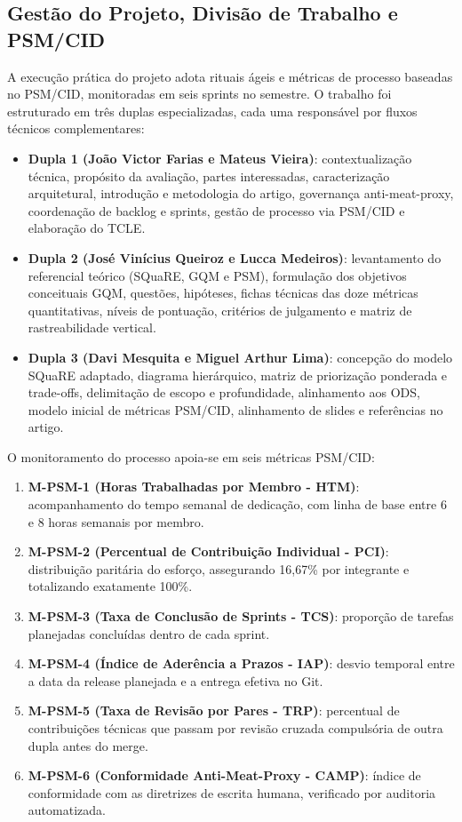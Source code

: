 \documentclass[journal]{IEEEtran}
\begin{document}
\subsection{Gestão do Projeto, Divisão de Trabalho e PSM/CID}
\label{sec:gestao_psm}

A execução prática do projeto adota rituais ágeis e métricas de processo baseadas no PSM/CID, monitoradas em seis sprints no semestre. O trabalho foi estruturado em três duplas especializadas, cada uma responsável por fluxos técnicos complementares:

\begin{itemize}
    \item \textbf{Dupla 1 (João Victor Farias e Mateus Vieira)}: contextualização técnica, propósito da avaliação, partes interessadas, caracterização arquitetural, introdução e metodologia do artigo, governança anti-meat-proxy, coordenação de backlog e sprints, gestão de processo via PSM/CID e elaboração do TCLE.
    \item \textbf{Dupla 2 (José Vinícius Queiroz e Lucca Medeiros)}: levantamento do referencial teórico (SQuaRE, GQM e PSM), formulação dos objetivos conceituais GQM, questões, hipóteses, fichas técnicas das doze métricas quantitativas, níveis de pontuação, critérios de julgamento e matriz de rastreabilidade vertical.
    \item \textbf{Dupla 3 (Davi Mesquita e Miguel Arthur Lima)}: concepção do modelo SQuaRE adaptado, diagrama hierárquico, matriz de priorização ponderada e trade-offs, delimitação de escopo e profundidade, alinhamento aos ODS, modelo inicial de métricas PSM/CID, alinhamento de slides e referências no artigo.
\end{itemize}

O monitoramento do processo apoia-se em seis métricas PSM/CID:
\begin{enumerate}
    \item \textbf{M-PSM-1 (Horas Trabalhadas por Membro - HTM)}: acompanhamento do tempo semanal de dedicação, com linha de base entre 6 e 8 horas semanais por membro.
    \item \textbf{M-PSM-2 (Percentual de Contribuição Individual - PCI)}: distribuição paritária do esforço, assegurando 16,67\% por integrante e totalizando exatamente 100\%.
    \item \textbf{M-PSM-3 (Taxa de Conclusão de Sprints - TCS)}: proporção de tarefas planejadas concluídas dentro de cada sprint.
    \item \textbf{M-PSM-4 (Índice de Aderência a Prazos - IAP)}: desvio temporal entre a data da release planejada e a entrega efetiva no Git.
    \item \textbf{M-PSM-5 (Taxa de Revisão por Pares - TRP)}: percentual de contribuições técnicas que passam por revisão cruzada compulsória de outra dupla antes do merge.
    \item \textbf{M-PSM-6 (Conformidade Anti-Meat-Proxy - CAMP)}: índice de conformidade com as diretrizes de escrita humana, verificado por auditoria automatizada.
\end{enumerate}
\end{document}
